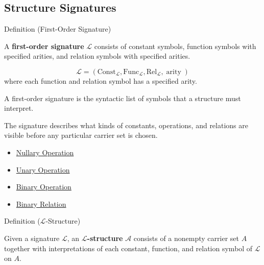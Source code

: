 \subsection*{Structure Signatures}
\label{subsec:structure-signatures}

\begin{definitionbox}{Definition (First-Order Signature)}
\begin{definition}
\label{def:first-order-signature}
A \textbf{first-order signature} $\mathcal{L}$ consists of constant symbols,
function symbols with specified arities, and relation symbols with specified
arities.
\end{definition}
\end{definitionbox}

\begin{remark*}
\[
\mathcal{L}=(\mathrm{Const}_{\mathcal{L}},
\mathrm{Func}_{\mathcal{L}},
\mathrm{Rel}_{\mathcal{L}},\operatorname{arity})
\]
where each function and relation symbol has a specified arity.
\end{remark*}

\begin{remark*}
A first-order signature is the syntactic list of symbols that a structure must
interpret.
\end{remark*}


\begin{remark*}[Interpretation]
The signature describes what kinds of constants, operations, and relations are
visible before any particular carrier set is chosen.
\end{remark*}

\begin{dependencies}
\begin{itemize}
  \item \hyperref[def:nullary-operation]{Nullary Operation}
  \item \hyperref[def:unary-operation]{Unary Operation}
  \item \hyperref[def:binary-operation]{Binary Operation}
  \item \hyperref[def:binary-relation]{Binary Relation}
\end{itemize}
\end{dependencies}

\begin{definitionbox}{Definition ($\mathcal{L}$-Structure)}
\begin{definition}
\label{def:algebraic-l-structure}
Given a signature $\mathcal{L}$, an \textbf{$\mathcal{L}$-structure}
$\mathcal{A}$ consists of a nonempty carrier set $A$ together with
interpretations of each constant, function, and relation symbol of
$\mathcal{L}$ on $A$.
\end{definition}
\end{definitionbox}

